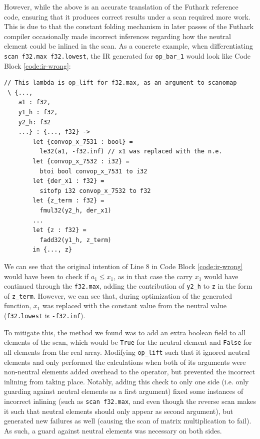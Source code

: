 \documentclass{article}
\newenvironment{code}{\captionsetup{type=listing}}{}
\begin{document}
However, while the above is an accurate translation of the Futhark reference code, ensuring that it produces correct results under a scan required more work. This is due to that the constant folding mechanism in later passes of the Futhark compiler occasionally made incorrect inferences regarding how the neutral element could be inlined in the scan. As a concrete example, when differentiating \lstinline{scan f32.max f32.lowest}, the IR generated for \lstinline{op_bar_1} would look like Code Block \ref{code:ir-wrong}:

\begin{code}
	\begin{verbatim}
// This lambda is op_lift for f32.max, as an argument to scanomap
 \ {...,
    a1 : f32,
    y1_h : f32,
    y2_h: f32
    ...} : {..., f32} ->
        let {convop_x_7531 : bool} =
          le32(a1, -f32.inf) // x1 was replaced with the n.e.
        let {convop_x_7532 : i32} =
          btoi bool convop_x_7531 to i32
        let {der_x1 : f32} =
          sitofp i32 convop_x_7532 to f32
        let {z_term : f32} =
          fmul32(y2_h, der_x1)
        ...
        let {z : f32} =
          fadd32(y1_h, z_term)
        in {..., z}
\end{verbatim}
	\caption{Incorrect IR for \lstinline{op_bar_1}. Names have been changed for clarity.\\}
	\label{code:ir-wrong}
\end{code}
\vspace{0.3cm}
We can see that the original intention of Line 8 in Code Block \ref{code:ir-wrong} would have been to check if $a_1 \leq x_1$, as in that case the carry $x_1$ would have continued through the \lstinline{f32.max}, adding the contribution of \lstinline{y2_h} to \lstinline{z} in the form of \lstinline{z_term}. However, we can see that, during optimization of the generated function, $x_1$ was replaced with the constant value from the neutral value (\lstinline{f32.lowest} is \lstinline{-f32.inf}).

To mitigate this, the method we found was to add an extra boolean field to all elements of the scan, which would be \lstinline{True} for the neutral element and \lstinline{False} for all elements from the real array. Modifying \lstinline{op_lift} such that it ignored neutral elements and only performed the calculations when both of its arguments were non-neutral elements added overhead to the operator, but prevented the incorrect inlining from taking place. Notably, adding this check to only one side (i.e. only guarding against neutral elements as a first argument) fixed some instances of incorrect inlining (such as \lstinline{scan f32.max}, and even though the reverse scan makes it such that neutral elements should only appear as second argument), but generated new failures as well (causing the scan of matrix multiplication to fail). As such, a guard against neutral elements was necessary on both sides.
\end{document}
